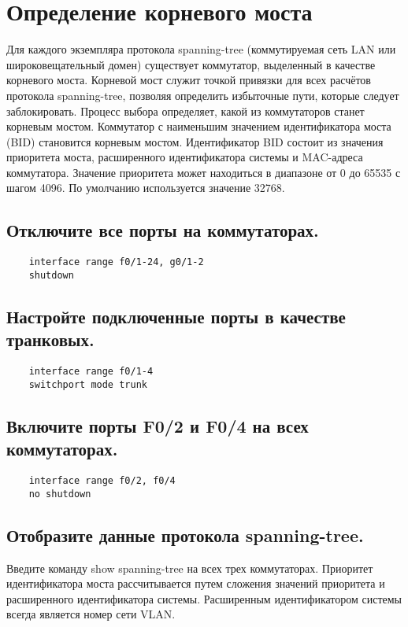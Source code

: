 \section{Определение корневого моста}
Для каждого экземпляра протокола spanning-tree (коммутируемая сеть LAN или широковещательный
домен) существует коммутатор, выделенный в качестве корневого моста.
Корневой мост служит точкой привязки для всех расчётов протокола spanning-tree, позволяя определить избыточные пути,
которые следует заблокировать.
Процесс выбора определяет, какой из коммутаторов станет корневым мостом.
Коммутатор с наименьшим значением идентификатора моста (BID) становится корневым мостом.
Идентификатор BID состоит из значения приоритета моста, расширенного идентификатора системы и MAC-адреса коммутатора.
Значение приоритета может находиться в диапазоне от 0 до 65535 с шагом 4096.
По умолчанию используется значение 32768.


\subsection{Отключите все порты на коммутаторах.}
\begin{verbatim}
    interface range f0/1-24, g0/1-2
    shutdown
\end{verbatim}

\subsection{Настройте подключенные порты в качестве транковых.}
\begin{verbatim}
    interface range f0/1-4
    switchport mode trunk
\end{verbatim}

\subsection{Включите порты F0/2 и F0/4 на всех коммутаторах.}
\begin{verbatim}
    interface range f0/2, f0/4
    no shutdown
\end{verbatim}

\subsection{Отобразите данные протокола spanning-tree.}
Введите команду show spanning-tree на всех трех коммутаторах.
Приоритет идентификатора моста рассчитывается путем сложения значений приоритета и расширенного идентификатора системы.
Расширенным идентификатором системы всегда является номер сети VLAN\@.

